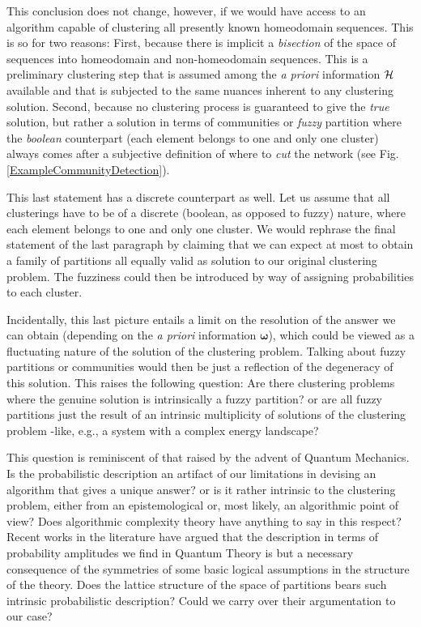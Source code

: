 \documentclass[twocolumn,aps,sort,nofootinbib]{revtex4}
\begin{document}
This conclusion does not change, however, if we would have access to an algorithm 
capable of clustering all presently known
homeodomain sequences. This is so for two reasons: First, because there is implicit
a {\sl bisection} of the space of sequences into homeodomain and non-homeodomain sequences.
This is a preliminary clustering step that is assumed among the {\sl a priori} information
${\cal H}$ available and that is subjected to the same nuances inherent to any clustering
solution. 
Second, because no clustering process is guaranteed to give the {\sl true} solution, but rather
a solution in terms of communities or {\sl fuzzy} partition where the {\sl boolean} counterpart 
(each element belongs to one and only one cluster) 
always comes after a subjective definition of where 
to {\sl cut} the network (see Fig.\ref{ExampleCommunityDetection}).

This last statement has a discrete counterpart as well. 
Let us assume
that all clusterings have to be of a discrete (boolean, as opposed
to fuzzy) nature, where each element belongs to one and only one cluster.
We would rephrase the final statement of the last paragraph by claiming
that we can expect at most to obtain a family of partitions all equally
valid as solution to our original clustering problem. The fuzziness could
then be introduced by way of assigning probabilities to each cluster.

Incidentally, this last picture entails a limit on the resolution of 
the answer we can obtain 
(depending on the {\sl a priori} information $\boldsymbol{\omega}$),
which could be viewed as a fluctuating nature of the solution of the clustering problem.
Talking about fuzzy partitions or communities would then be just
a reflection of the degeneracy of this solution.
This raises the following question: Are there clustering problems where
the genuine solution is intrinsically a fuzzy partition? or are all
fuzzy partitions just the result of an intrinsic multiplicity
of solutions of the clustering problem 
-like, e.g., a system with a complex energy landscape? 

This question is reminiscent of that raised by the advent of 
Quantum Mechanics. Is the probabilistic description an artifact
of our limitations in devising an algorithm that gives a unique
answer? or is it rather intrinsic to the clustering problem, 
either from an epistemological
or, most likely, an algorithmic point of view?
Does algorithmic complexity theory have anything to say in this 
respect? 
Recent works in the literature have argued that the description
in terms of probability amplitudes we find in Quantum Theory
is but a necessary consequence of the symmetries of some basic
logical assumptions in the structure of the theory\cite{Goyal11,Goyal10}. 
Does the lattice structure of the space of partitions bears
such intrinsic probabilistic description? Could we 
carry over their argumentation to our case?
\end{document}
